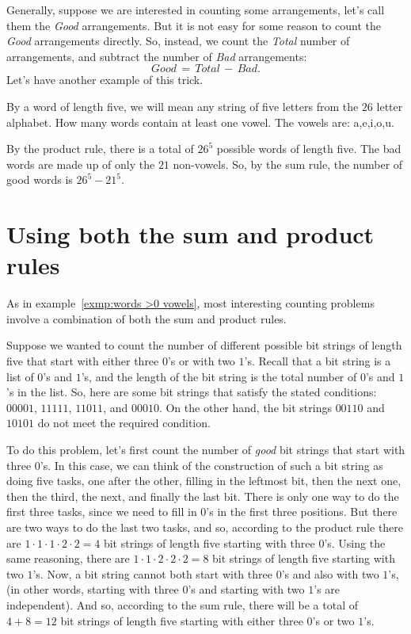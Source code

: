 Generally, suppose we are interested in counting some arrangements,
let's call them the {\itshape Good} arrangements. But it is not easy for some reason
to count the {\itshape Good} arrangements directly. So, instead, we count the {\itshape Total}
number of arrangements, and subtract the number of {\itshape Bad} arrangements:
\[
Good \,=\, Total\,-\,Bad.
\]
Let's have another example of this trick.
\begin{exmp}\label{exmp:words >0 vowels}
 By a word of length five, we will mean any string
 of five letters from the $26$ letter alphabet. How many words contain
 at least one vowel. The vowels are: \textsf{a,e,i,o,u}.
 
 By the product rule, there is a total of $26^5$ possible words of
 length five. The bad words are made up of only the $21$ non-vowels.
 So, by the sum rule, the number of good words is $26^5-21^5$.
\end{exmp}


\section{Using both the sum and product rules}
As in  example~\ref{exmp:words >0 vowels}, 
most interesting counting problems involve a combination of both the sum and
product rules.

\begin{exmp}
Suppose we wanted to count the number of different possible bit strings of length
five that start with either three $0$'s or with two $1$'s. Recall that a bit
string is a list of $0$'s and $1$'s, and the length of the bit string is the total
number of $0$'s and $1$'s in the list. So, here are some bit strings that satisfy
the stated conditions: $00001$, $11111$, $11011$, and $00010$. On the other hand,
the bit strings $00110$ and $10101$ do not meet the required condition. 

To do this
problem, let's first count the number of {\itshape good} bit strings that start with
three $0$'s. In this case, we can think of the construction of such a bit string as
doing five tasks, one after the other, filling in the leftmost bit, then the next
one, then the third, the next, and finally the last bit. There is only one way to
do the first three tasks, since we need to fill in $0$'s in the first three
positions. But there are two ways to do the last two tasks, and so, according to
the product rule there are $1\cdot1\cdot1\cdot2\cdot2 = 4$ bit strings of length
five starting with three $0$'s. Using the same reasoning, there are
$1\cdot1\cdot2\cdot2\cdot2=8$ bit strings of length five starting with two
$1$'s. Now, a bit string cannot both start with three $0$'s and also with two
$1$'s, (in other words, starting with three $0$'s and starting with two $1$'s are
independent). And so, according to the sum rule, there will be a total of $4+8=12$
bit strings of length five starting with either three $0$'s or two $1$'s.
\end{exmp}

